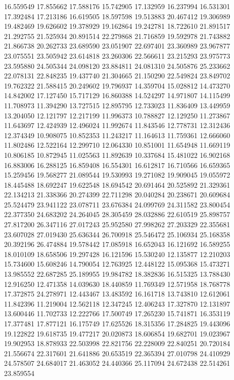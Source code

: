 16.559549
17.855662
17.588176
15.742905
17.132959
16.237994
16.531301
17.392484
17.213186
16.619505
18.597598
19.513883
20.467412
19.306989
19.482469
19.626602
19.378929
19.162864
19.242781
18.722610
21.891517
21.292755
21.525934
20.891514
22.279868
21.716859
19.592978
21.743882
21.866738
20.262733
23.689590
23.051907
22.697401
23.360989
23.967877
23.075551
23.505942
23.614818
23.260306
22.566611
23.215293
23.975773
23.595880
24.505344
24.098120
23.884811
24.081310
24.505876
25.233662
22.078131
22.848235
19.437740
21.304665
21.150290
22.549824
23.849702
19.762322
21.588415
20.249602
19.796937
14.359704
15.028812
14.473270
14.842002
17.127450
15.717129
16.860388
14.524297
14.971807
14.115499
11.708973
11.394290
13.727515
12.895795
12.733023
11.836409
13.449959
13.204050
12.121797
12.217199
11.996373
10.788827
12.129250
11.273867
11.643697
12.424939
12.496024
11.992674
11.843546
12.778731
12.312436
12.374349
10.908075
10.852353
11.243217
11.164613
11.759361
12.666060
11.802486
12.522164
12.299710
12.064330
10.851001
11.654948
11.669119
10.806185
10.872945
11.025563
11.892639
10.337684
15.481022
16.902168
16.883006
16.288125
16.859408
16.554301
16.612817
16.710566
16.659365
15.259456
19.568277
21.089544
19.530993
19.271082
19.909045
19.055972
18.445488
18.692247
19.622548
18.694542
20.691464
20.525892
21.329361
22.134213
21.338366
20.274399
22.711298
20.040284
20.238671
20.609684
25.524479
23.941122
23.078711
23.676384
24.099769
24.311582
23.800454
22.377350
24.683202
24.264045
28.305459
28.032886
22.610519
25.898757
27.817200
26.347116
27.017243
25.952580
27.998262
27.203329
22.355681
23.607028
27.019430
25.636344
26.700918
25.546472
25.106934
25.168358
20.392196
26.474884
19.578442
17.085918
16.652043
16.121692
16.589255
18.010109
18.658506
19.297428
16.121596
15.530240
12.135877
12.210203
15.734600
15.608246
14.790054
12.763925
12.448122
15.095368
15.473271
13.985552
22.687285
25.189955
19.984782
18.382836
16.515325
13.788430
12.916250
12.471358
14.039630
18.440859
11.769349
12.571958
18.768778
17.372875
24.278971
12.443467
13.483592
16.161718
13.743810
12.612061
11.842396
11.219004
12.562118
12.347245
12.406243
17.327870
12.131897
13.600446
11.702733
12.222766
17.500749
17.265230
15.741871
16.353119
17.377481
17.877121
16.175749
17.625526
18.315356
17.284825
19.443096
19.122822
19.618735
19.477217
20.020873
18.606854
19.682701
19.023967
19.902953
18.878933
22.503998
22.821756
22.228009
22.840251
20.720184
21.556674
22.317601
21.641886
20.653519
22.365394
27.010798
24.410929
24.578507
24.684017
21.463052
24.440366
25.117094
24.672438
22.514261
23.859554
